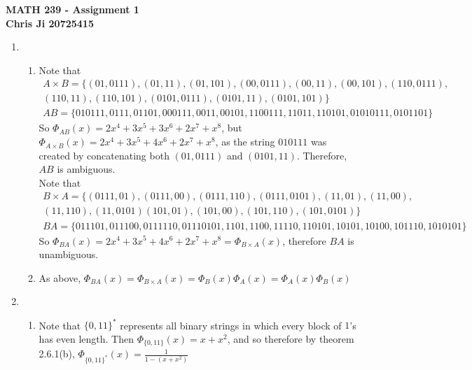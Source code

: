 \documentclass[10pt,english]{article}
\begin{document}
\noindent \begin{center}
\textbf{\large{}MATH 239 - Assignment 1}\\
\textbf{\large{}Chris Ji 20725415}
\par\end{center}{\large \par}
\medskip{}

\begin{enumerate}
\item \begin{enumerate}
    \item Note that \begin{gather*}A\times B=\{(01,0111),(01,11),(01,101),(00,0111),(00,11),(00,101),(110,0111),\\(110,11),(110,101),(0101,0111),(0101,11),(0101,101)\}\end{gather*}
    \begin{gather*}AB=\{010111,0111,01101,000111,0011,00101,1100111,11011,110101,01010111,0101101\}\end{gather*} So $\Phi_{AB}(x)=2x^4+3x^5+3x^6+2x^7+x^8$, but $\Phi_{A\times B}(x)=2x^4+3x^5+4x^6+2x^7+x^8$, as the string $010111$ was created by concatenating both $(01,0111)$ and $(0101,11)$. Therefore, $AB$ is ambiguous. \\ 
    Note that \begin{gather*}B\times A=\{(0111,01),(0111,00),(0111,110),(0111,0101),(11,01),(11,00),\\(11,110),(11,0101)(101,01),(101,00),(101,110),(101,0101)\}\end{gather*} \begin{gather*}BA=\{011101,011100,0111110,01110101,1101,1100,11110,110101,10101,10100,101110,1010101\}\end{gather*} So $\Phi_{BA}(x)=2x^4+3x^5+4x^6+2x^7+x^8=\Phi_{B\times A}(x)$, therefore $BA$ is unambiguous. 
    \item As above, $\Phi_{BA}(x)=\Phi_{B\times A}(x)=\Phi_{B}(x)\Phi_{A}(x)=\Phi_{A}(x)\Phi_{B}(x)$
\end{enumerate}
\pagebreak
\item
\begin{enumerate}
    \item Note that $\{0,11\}^*$ represents all binary strings in which every block of $1$'s has even length. Then $\Phi_{\{0,11\}}(x)=x+x^2$, and so therefore by theorem 2.6.1(b), $\Phi_{\{0,11\}^*}(x)=\frac{1}{1-(x+x^2)}$
    

\end{enumerate}
\end{enumerate}
\end{document}
